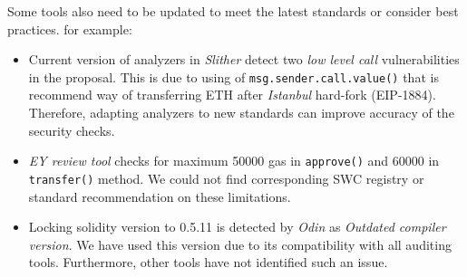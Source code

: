 Some tools also need to be updated to meet the latest standards or consider best practices. for example:
\begin{itemize}[leftmargin=*]
	\item Current version of analyzers\cite{SlitherSetup} in \textit{Slither} detect two \textit{low level call} vulnerabilities in the proposal. This is due to using of \texttt{msg.sender.call.value()} that is recommend way of transferring ETH after \textit{Istanbul} hard-fork (EIP-1884).	Therefore, adapting analyzers to new standards can improve accuracy of the security checks.
	\item \textit{EY review tool} checks for maximum 50000 gas in \texttt{approve()} and 60000 in \texttt{transfer()} method. We could not find corresponding SWC registry or standard recommendation on these limitations.
	\item Locking solidity version to 0.5.11 is detected by \textit{Odin} as \textit{Outdated compiler version}. We have used this version due to its compatibility with all auditing tools. Furthermore, other tools have not identified such an issue.
\end{itemize}

